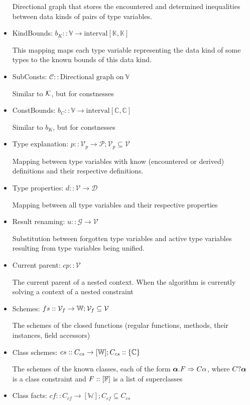 \begin{defn}
\begin{itemize}
        Directional graph that stores the encountered and determined inequalities between data kinds of pairs of type variables.
        \item KindBounds: $b_K :: \mathbb{V} \to \text{interval} \left[\mathbb{K}, \mathbb{K}\right]$

        This mapping maps each type variable representing the data kind of some types to the known bounds of this data kind.
        \item SubConsts: $\mathcal{C} :: \text{Directional graph on}\ \mathbb{V}$

        Similar to $\mathcal{K}$, but for constnesses
        \item ConstBounds: $b_C :: \mathbb{V} \to \text{interval} \left[\mathbb{C}, \mathbb{C}\right]$

        Similar to $b_K$, but for constnesses
        \item Type explanation: $p :: \mathcal{V}_p \to \mathcal{P}; \mathcal{V}_p \subseteq \mathcal{V}$

        Mapping between type variables with know (encountered or derived) definitions and their respective definitions.
        \item Type properties: $d :: \mathcal{V} \to \mathcal{D}$

        Mapping between all type variables and their respective properties
        \item Result renaming: $u :: \mathcal{G} \to \mathcal{V}$

        Substitution between forgotten type variables and active type variables resulting from type variables being unified.
        \item Current parent: $cp :: \mathcal{V}$

        The current parent of a nested context. When the algorithm is currently solving a context of a nested constraint
        \item Schemes: $fs :: \mathcal{V}_f \to \mathbb{W}; \mathcal V_f \subseteq \mathcal V$

        The schemes of the closed functions (regular functions, methods, their instances, field accessors)
        \item Class schemes: $cs :: C_{cs} \to [\mathbb{W}]; C_{cs} :: \{\mathbb{C}\}$

        The schemes of the known classes, each of the form $\boldsymbol{\alpha} . F \Rightarrow C \alpha$, where $C?  \boldsymbol{\alpha}$ is a class constraint and $F :: [\mathbb{F}]$ is a list of superclasses
        \item Class facts: $cf :: C_{cf} \to [\mathbb{W}]; C_{cf} \subseteq C_{cs}$


\end{itemize}
\end{defn}
